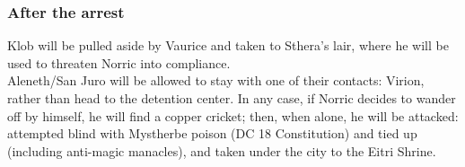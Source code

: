 \subsubsection{After the arrest}
Klob will be pulled aside by Vaurice and taken to Sthera's lair, where he will be used to threaten Norric into compliance.\\
Aleneth/San Juro will be allowed to stay with one of their contacts: Virion, rather than head to the detention center. In any case, if Norric decides to wander off by himself, he will find a copper cricket; then, when alone, he will be attacked: attempted blind with Mystherbe poison (DC 18 Constitution) and tied up (including anti-magic manacles), and taken under the city to the Eitri Shrine. 



